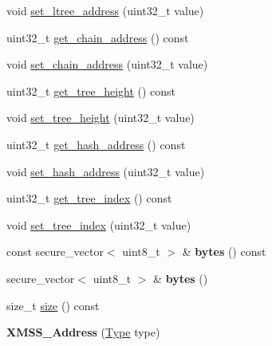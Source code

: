 \begin{DoxyCompactItemize}
void \mbox{\hyperlink{class_botan_1_1_x_m_s_s___address_af410fcbcc750a12e8650307d51003bc2}{set\+\_\+ltree\+\_\+address}} (uint32\+\_\+t value)
\item 
uint32\+\_\+t \mbox{\hyperlink{class_botan_1_1_x_m_s_s___address_adbab35e6d0dc8a0ff3e5c95ffa73cbee}{get\+\_\+chain\+\_\+address}} () const
\item 
void \mbox{\hyperlink{class_botan_1_1_x_m_s_s___address_a766e70130914b681020366d80c625fce}{set\+\_\+chain\+\_\+address}} (uint32\+\_\+t value)
\item 
uint32\+\_\+t \mbox{\hyperlink{class_botan_1_1_x_m_s_s___address_a7e619c5b15ba74f596eb3d5b6035a0f1}{get\+\_\+tree\+\_\+height}} () const
\item 
void \mbox{\hyperlink{class_botan_1_1_x_m_s_s___address_a9bf7df26a0cfc5fee8bb44e22927f61c}{set\+\_\+tree\+\_\+height}} (uint32\+\_\+t value)
\item 
uint32\+\_\+t \mbox{\hyperlink{class_botan_1_1_x_m_s_s___address_af6ac58ed613b3b523628ccfcde73f7c2}{get\+\_\+hash\+\_\+address}} () const
\item 
void \mbox{\hyperlink{class_botan_1_1_x_m_s_s___address_a0a5d46d9a17f3a39808356d079b592fa}{set\+\_\+hash\+\_\+address}} (uint32\+\_\+t value)
\item 
uint32\+\_\+t \mbox{\hyperlink{class_botan_1_1_x_m_s_s___address_a40990bf9e24b0f2967d18ed6af4197a9}{get\+\_\+tree\+\_\+index}} () const
\item 
void \mbox{\hyperlink{class_botan_1_1_x_m_s_s___address_a9e084bac434f5bca79368d145c4ac991}{set\+\_\+tree\+\_\+index}} (uint32\+\_\+t value)
\item 
\mbox{\label{class_botan_1_1_x_m_s_s___address_a6f22da8d3fde8b130555e33154386bba}} 
const secure\+\_\+vector$<$ uint8\+\_\+t $>$ \& {\bfseries bytes} () const
\item 
\mbox{\label{class_botan_1_1_x_m_s_s___address_a3810c637960602319bb78422e8d8f490}} 
secure\+\_\+vector$<$ uint8\+\_\+t $>$ \& {\bfseries bytes} ()
\item 
size\+\_\+t \mbox{\hyperlink{class_botan_1_1_x_m_s_s___address_a295db70b7603a66df6ebf20667dc9a9f}{size}} () const
\item 
\mbox{\label{class_botan_1_1_x_m_s_s___address_ad381cc81c47920eef6390dfbf506f93a}} 
{\bfseries X\+M\+S\+S\+\_\+\+Address} (\mbox{\hyperlink{class_botan_1_1_x_m_s_s___address_a0101e45c5608cf312b497bf6d855000e}{Type}} type)

\end{DoxyCompactItemize}
